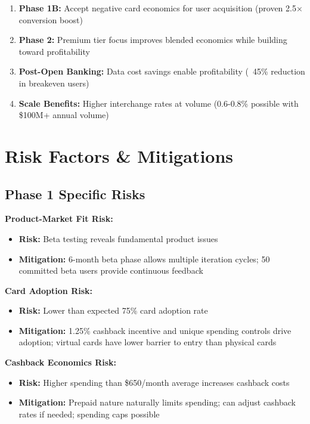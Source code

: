 \documentclass[11pt,letterpaper]{article}
\begin{document}
\begin{enumerate}
\item \textbf{Phase 1B:} Accept negative card economics for user acquisition (proven 2.5× conversion boost)
\item \textbf{Phase 2:} Premium tier focus improves blended economics while building toward profitability
\item \textbf{Post-Open Banking:} Data cost savings enable profitability (~45\% reduction in breakeven users)
\item \textbf{Scale Benefits:} Higher interchange rates at volume (0.6-0.8\% possible with \$100M+ annual volume)
\end{enumerate}

\newpage

\section{Risk Factors \& Mitigations}

\subsection{Phase 1 Specific Risks}

\textbf{Product-Market Fit Risk:}
\begin{itemize}
\item \textbf{Risk:} Beta testing reveals fundamental product issues
\item \textbf{Mitigation:} 6-month beta phase allows multiple iteration cycles; 50 committed beta users provide continuous feedback
\end{itemize}

\textbf{Card Adoption Risk:}
\begin{itemize}
\item \textbf{Risk:} Lower than expected 75\% card adoption rate
\item \textbf{Mitigation:} 1.25\% cashback incentive and unique spending controls drive adoption; virtual cards have lower barrier to entry than physical cards
\end{itemize}

\textbf{Cashback Economics Risk:}
\begin{itemize}
\item \textbf{Risk:} Higher spending than \$650/month average increases cashback costs
\item \textbf{Mitigation:} Prepaid nature naturally limits spending; can adjust cashback rates if needed; spending caps possible
\end{itemize}
\end{document}
